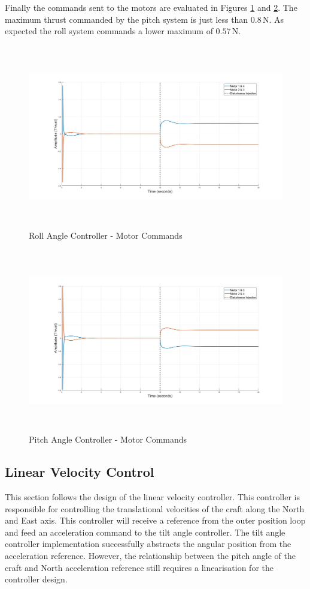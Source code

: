 		Finally the commands sent to the motors are evaluated in Figures \ref{IM_RollAngleImpulse} and \ref{IM_PitchAngleImpulse}. The maximum thrust commanded by the pitch system is just less than $0.8$\,N. As expected the roll system commands a lower maximum of $0.57$\,N.
		
		\begin{figure}[H]
			\centering
			\includegraphics[height = 8cm]{../Design/Matlab/Controllers/roll_angle_impulse.jpg}
			\caption{Roll Angle Controller -  Motor Commands}
			\label{IM_RollAngleImpulse}
		\end{figure}
				
		\begin{figure}[H]
			\centering
			\includegraphics[height = 8cm]{../Design/Matlab/Controllers/pitch_angle_impulse.jpg}
			\caption{Pitch Angle Controller -  Motor Commands}
			\label{IM_PitchAngleImpulse}
		\end{figure}
	
	\subsection{Linear Velocity Control}
	This section follows the design of the linear velocity controller. This controller is responsible for controlling the translational velocities of the craft along the North and East axis. This controller will receive a reference from the outer position loop and feed an acceleration command to the tilt angle controller. The tilt angle controller implementation successfully abstracts the angular position from the acceleration reference. However, the relationship between the pitch angle of the craft and North acceleration reference still requires a linearisation for the controller design. 
	
